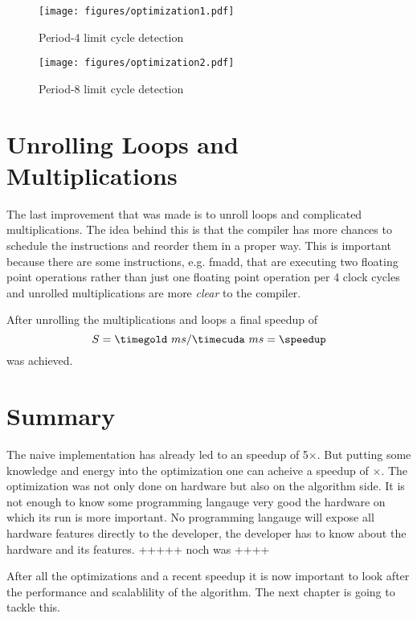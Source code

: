 \begin{figure}[ht] \centering
\texttt{[image: figures/optimization1.pdf]}%
\caption{Period-4 limit cycle detection}
\label{fig:lc1}%
\end{figure}
\begin{figure}[ht] \centering
\texttt{[image: figures/optimization2.pdf]}%
\caption{Period-8 limit cycle detection}
\label{fig:lc2}%
\end{figure}

\section{Unrolling Loops and Multiplications} %
\label{sec:unrolling_loops_and_multiplications}
The last improvement that was made is to unroll loops and complicated
multiplications. The idea behind this is that the compiler has more chances to
schedule the instructions and reorder them in a proper way. This is important
because there are some instructions, e.g. \textsf{fmadd}, that are executing two
floating point operations rather than just one floating point operation per 4
clock cycles and unrolled multiplications are more \emph{clear} to the compiler. 

After unrolling the multiplications and loops a final speedup of 
\fpDiv{\speedup}{\timegold}{\timecuda}
\begin{equation*}\label{eq:speedup11}
	S = \timegold\ ms/\timecuda\ ms = \speedup
\end{equation*}
was achieved.

\section{Summary} %
\label{sec:summary}
The naive implementation has already led to an speedup of 5$\times$. But putting
some knowledge and energy into the optimization one can acheive a speedup of 
\speedup$\times$. The optimization was not only done on hardware but also on the 
algorithm side. It is not enough to know some programming langauge very good the
hardware on which its run is more important. No programming langauge will expose
all hardware features directly to the developer, the developer has to know
about the hardware and its features. {\color{red} +++++ noch was ++++}

After all the optimizations and a recent speedup it is now important to look 
after the performance and scalablility of the algorithm. The next chapter is 
going to tackle this. 





